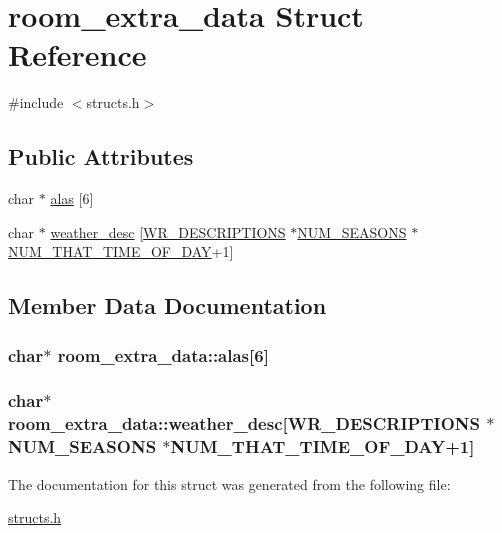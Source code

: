 \hypertarget{structroom__extra__data}{\section{room\-\_\-extra\-\_\-data Struct Reference}
\label{structroom__extra__data}
}


{\ttfamily \#include $<$structs.\-h$>$}

\subsection*{Public Attributes}
\begin{DoxyCompactItemize}
\item 
char $\ast$ \hyperlink{structroom__extra__data_a1a5764f5550696ec1368450a51a92760}{alas} \mbox{[}6\mbox{]}
\item 
char $\ast$ \hyperlink{structroom__extra__data_af6726484510068b64b23f62dcb58ccd2}{weather\-\_\-desc} \mbox{[}\hyperlink{structs_8h_ae2be9837d552fbbb9b3b3b8a92dad6be}{W\-R\-\_\-\-D\-E\-S\-C\-R\-I\-P\-T\-I\-O\-N\-S} $\ast$\hyperlink{structs_8h_a72b022854ed709ba0762ac595d7f9fa8}{N\-U\-M\-\_\-\-S\-E\-A\-S\-O\-N\-S} $\ast$\hyperlink{structs_8h_a29e7e96de09b75660c719e5a295e2d85}{N\-U\-M\-\_\-\-T\-H\-A\-T\-\_\-\-T\-I\-M\-E\-\_\-\-O\-F\-\_\-\-D\-A\-Y}+1\mbox{]}
\end{DoxyCompactItemize}


\subsection{Member Data Documentation}
\hypertarget{structroom__extra__data_a1a5764f5550696ec1368450a51a92760}{
\subsubsection[{alas}]{\setlength{\rightskip}{0pt plus 5cm}char$\ast$ room\-\_\-extra\-\_\-data\-::alas\mbox{[}6\mbox{]}}}\label{structroom__extra__data_a1a5764f5550696ec1368450a51a92760}
\hypertarget{structroom__extra__data_af6726484510068b64b23f62dcb58ccd2}{
\subsubsection[{weather\-\_\-desc}]{\setlength{\rightskip}{0pt plus 5cm}char$\ast$ room\-\_\-extra\-\_\-data\-::weather\-\_\-desc\mbox{[}{\bf W\-R\-\_\-\-D\-E\-S\-C\-R\-I\-P\-T\-I\-O\-N\-S} $\ast${\bf N\-U\-M\-\_\-\-S\-E\-A\-S\-O\-N\-S} $\ast${\bf N\-U\-M\-\_\-\-T\-H\-A\-T\-\_\-\-T\-I\-M\-E\-\_\-\-O\-F\-\_\-\-D\-A\-Y}+1\mbox{]}}}\label{structroom__extra__data_af6726484510068b64b23f62dcb58ccd2}


The documentation for this struct was generated from the following file\-:\begin{DoxyCompactItemize}
\item 
\hyperlink{structs_8h}{structs.\-h}\end{DoxyCompactItemize}
